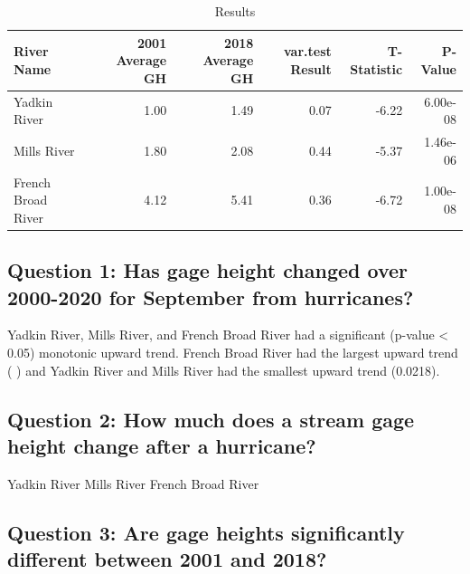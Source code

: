 \documentclass[12pt,]{article}
\begin{document}
\begin{table}

\caption{\label{tab:T-Test}Results}
\centering
\begin{tabular}[t]{|>{}l|||>{}r|||>{}r|||>{}r|||>{}r||r}
\hline
River Name & 2001 Average GH & 2018 Average GH & var.test Result & T-Statistic & P-Value\\
\hline
Yadkin River & 1.00 & 1.49 & 0.07 & -6.22 & 6.00e-08\\
\hline
Mills River & 1.80 & 2.08 & 0.44 & -5.37 & 1.46e-06\\
\hline
French Broad River & 4.12 & 5.41 & 0.36 & -6.72 & 1.00e-08\\
\hline
\end{tabular}
\end{table}

\hypertarget{question-1-has-gage-height-changed-over-2000-2020-for-september-from-hurricanes}{%
\subsection{Question 1: Has gage height changed over 2000-2020 for
September from
hurricanes?}\label{question-1-has-gage-height-changed-over-2000-2020-for-september-from-hurricanes}}

Yadkin River, Mills River, and French Broad River had a significant
(p-value \textless{} 0.05) monotonic upward trend. French Broad River
had the largest upward trend ( ) and Yadkin River and Mills River had
the smallest upward trend (0.0218).

\hypertarget{question-2-how-much-does-a-stream-gage-height-change-after-a-hurricane}{%
\subsection{Question 2: How much does a stream gage height change after
a
hurricane?}\label{question-2-how-much-does-a-stream-gage-height-change-after-a-hurricane}}

Yadkin River Mills River French Broad River

\hypertarget{question-3-are-gage-heights-significantly-different-between-2001-and-2018}{%
\subsection{Question 3: Are gage heights significantly different between
2001 and
2018?}\label{question-3-are-gage-heights-significantly-different-between-2001-and-2018}}
\end{document}
